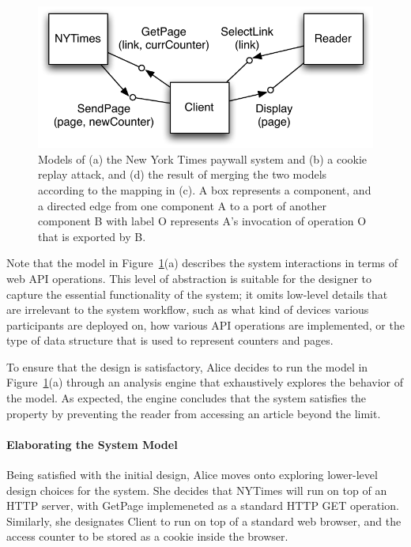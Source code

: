 \begin{figure}[!t]
\centering
\includegraphics[width=1.0\textwidth]{diagrams/nytimes}
\caption{Models of (a) the New York Times paywall system and (b) a
  cookie replay attack, and (d) the result of merging the two models
  according to the mapping in (c). A box represents a component, and a
  directed edge from one component \textsf{A} to a port of another component
  \textsf{B} with label \textsf{O} represents \textsf{A}'s invocation
  of operation \textsf{O} that is exported by \textsf{B}.}
\label{fig-nytimes}
\end{figure}

Note that the model in Figure~\ref{fig-nytimes}(a) describes the system
interactions in terms of web API operations. This level of abstraction
is suitable for the designer to capture the essential functionality of
the system; it omits low-level details that are irrelevant to the
system workflow, such as what kind of devices various participants
are deployed on, how various API operations are implemented, or the
type of data structure that is used to represent counters and pages.

To ensure that the design is satisfactory, Alice decides to run the
model in Figure~\ref{fig-nytimes}(a) through an analysis engine that
exhaustively explores the behavior of the model. As expected, the
engine concludes that the system satisfies the property by preventing
the reader from accessing an article beyond the limit.

\paragraph{\textbf{Elaborating the System Model}} Being satisfied with the
initial design, Alice moves onto exploring lower-level design
choices for the system. She decides that \textsf{NYTimes} will run on
top of an HTTP server, with \textsf{GetPage} implemeneted as a
standard HTTP GET operation. Similarly, she
designates \textsf{Client} to run on top of a standard web browser,
and the access counter to be stored as a cookie inside the browser.

